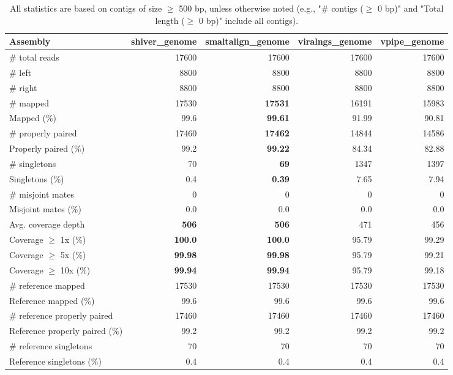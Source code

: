 \documentclass[12pt,a4paper]{article}
\begin{document}
\begin{table}[ht]
\begin{center}
\caption{All statistics are based on contigs of size $\geq$ 500 bp, unless otherwise noted (e.g., "\# contigs ($\geq$ 0 bp)" and "Total length ($\geq$ 0 bp)" include all contigs).}
\begin{tabular}{|l*{4}{|r}|}
\hline
Assembly & shiver\_genome & smaltalign\_genome & viralngs\_genome & vpipe\_genome \\ \hline
\# total reads & 17600 & 17600 & 17600 & 17600 \\ \hline
\# left & 8800 & 8800 & 8800 & 8800 \\ \hline
\# right & 8800 & 8800 & 8800 & 8800 \\ \hline
\# mapped & 17530 & {\bf 17531} & 16191 & 15983 \\ \hline
Mapped (\%) & 99.6 & {\bf 99.61} & 91.99 & 90.81 \\ \hline
\# properly paired & 17460 & {\bf 17462} & 14844 & 14586 \\ \hline
Properly paired (\%) & 99.2 & {\bf 99.22} & 84.34 & 82.88 \\ \hline
\# singletons & 70 & {\bf 69} & 1347 & 1397 \\ \hline
Singletons (\%) & 0.4 & {\bf 0.39} & 7.65 & 7.94 \\ \hline
\# misjoint mates & 0 & 0 & 0 & 0 \\ \hline
Misjoint mates (\%) & 0.0 & 0.0 & 0.0 & 0.0 \\ \hline
Avg. coverage depth & {\bf 506} & {\bf 506} & 471 & 456 \\ \hline
Coverage $\geq$ 1x (\%) & {\bf 100.0} & {\bf 100.0} & 95.79 & 99.29 \\ \hline
Coverage $\geq$ 5x (\%) & {\bf 99.98} & {\bf 99.98} & 95.79 & 99.21 \\ \hline
Coverage $\geq$ 10x (\%) & {\bf 99.94} & {\bf 99.94} & 95.79 & 99.18 \\ \hline
\# reference mapped & 17530 & 17530 & 17530 & 17530 \\ \hline
Reference mapped (\%) & 99.6 & 99.6 & 99.6 & 99.6 \\ \hline
\# reference properly paired & 17460 & 17460 & 17460 & 17460 \\ \hline
Reference properly paired (\%) & 99.2 & 99.2 & 99.2 & 99.2 \\ \hline
\# reference singletons & 70 & 70 & 70 & 70 \\ \hline
Reference singletons (\%) & 0.4 & 0.4 & 0.4 & 0.4 \\ \hline

\end{tabular}
\end{center}
\end{table}
\end{document}
